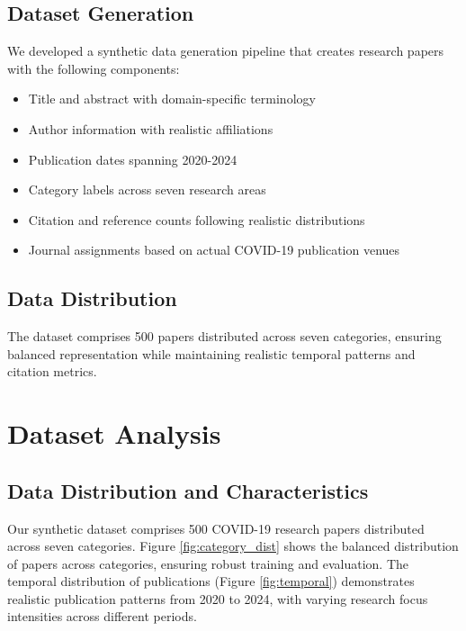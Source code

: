 \documentclass[12pt,a4paper]{article}
\begin{document}
\subsection{Dataset Generation}
We developed a synthetic data generation pipeline that creates research papers with the following components:
\begin{itemize}
    \item Title and abstract with domain-specific terminology
    \item Author information with realistic affiliations
    \item Publication dates spanning 2020-2024
    \item Category labels across seven research areas
    \item Citation and reference counts following realistic distributions
    \item Journal assignments based on actual COVID-19 publication venues
\end{itemize}

\subsection{Data Distribution}
The dataset comprises 500 papers distributed across seven categories, ensuring balanced representation while maintaining realistic temporal patterns and citation metrics.

\section{Dataset Analysis}

\subsection{Data Distribution and Characteristics}
Our synthetic dataset comprises 500 COVID-19 research papers distributed across seven categories. Figure \ref{fig:category_dist} shows the balanced distribution of papers across categories, ensuring robust training and evaluation. The temporal distribution of publications (Figure \ref{fig:temporal}) demonstrates realistic publication patterns from 2020 to 2024, with varying research focus intensities across different periods.
\end{document}

